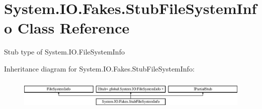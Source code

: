\hypertarget{class_system_1_1_i_o_1_1_fakes_1_1_stub_file_system_info}{\section{System.\-I\-O.\-Fakes.\-Stub\-File\-System\-Info Class Reference}
\label{class_system_1_1_i_o_1_1_fakes_1_1_stub_file_system_info}
}


Stub type of System.\-I\-O.\-File\-System\-Info 


Inheritance diagram for System.\-I\-O.\-Fakes.\-Stub\-File\-System\-Info\-:\begin{figure}[H]
\begin{center}
\leavevmode
\includegraphics[height=1.475626cm]{class_system_1_1_i_o_1_1_fakes_1_1_stub_file_system_info}
\end{center}
\end{figure}

